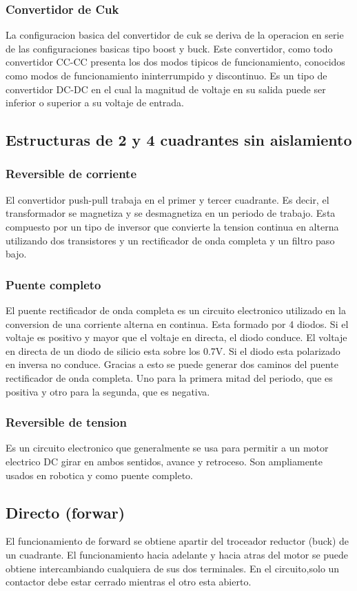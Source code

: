 \documentclass[11pt]{article}
\begin{document}
\subsubsection{Convertidor de Cuk}
La configuracion basica del convertidor de cuk se deriva de la operacion en serie de las
configuraciones basicas tipo boost y buck. Este convertidor, como todo convertidor CC-CC
presenta los dos modos tipicos de funcionamiento, conocidos como modos de funcionamiento
ininterrumpido y discontinuo. Es un tipo de convertidor DC-DC en el cual la magnitud de
voltaje en su salida puede ser inferior o superior a su voltaje de entrada.
\subsection{Estructuras de 2 y 4 cuadrantes sin aislamiento}
\subsubsection{Reversible de corriente}
El convertidor push-pull trabaja en el primer y tercer cuadrante. Es decir, el transformador
se magnetiza y se desmagnetiza en un periodo de trabajo. Esta compuesto por un tipo de 
inversor que convierte la tension continua en alterna utilizando dos transistores y un rectificador
de onda completa y un filtro paso bajo.
\subsubsection{Puente completo}
El puente rectificador de onda completa es un circuito electronico utilizado en la conversion
de una corriente alterna en continua. Esta formado por 4 diodos. Si
el voltaje es positivo y mayor que el voltaje en directa, el diodo conduce. El
voltaje en directa de un diodo de silicio esta sobre los 0.7V. Si el diodo esta polarizado en inversa
no conduce. Gracias a esto se puede generar dos caminos del puente rectificador de onda
completa. Uno para la primera mitad del periodo, que es positiva y otro para la segunda, que
es negativa.
\subsubsection{Reversible de tension}
Es un circuito electronico que generalmente se usa para permitir a un motor electrico DC
girar en ambos sentidos, avance y retroceso. Son ampliamente usados en robotica y como puente
completo.
\subsection{Directo (forwar)}
El funcionamiento de forward se obtiene apartir del troceador reductor (buck) de un cuadrante. El funcionamiento hacia adelante y hacia atras del motor se puede obtiene intercambiando cualquiera de sus dos terminales. En el circuito,solo un contactor debe estar cerrado mientras el otro esta
abierto.
\end{document}
